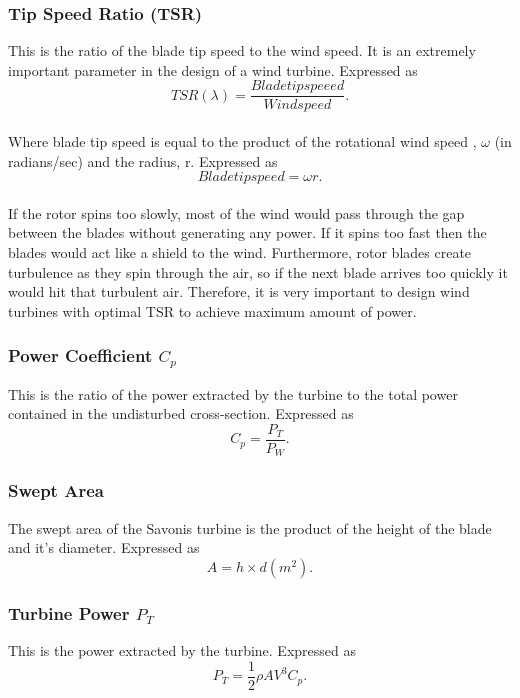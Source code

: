 \documentclass[titlepage]{article}
\begin{document}
\subsubsection{Tip Speed Ratio (TSR)} This is the ratio of the blade tip speed to the wind speed. It is an extremely important parameter in the design of a wind turbine. Expressed as 
\begin{equation}\label{}
    TSR(\lambda) = \frac{Blade tip speeed}{Wind speed}.
\end{equation}
    \paragraph{}Where blade tip speed is equal to the product of the rotational wind speed , $\omega$ (in radians/sec) and the radius, r. Expressed as 
\begin{equation}\label{}
    Bladetipspeed = \omega r.
\end{equation}
\paragraph{} If the rotor spins too slowly, most of the wind would pass through the gap between the blades without generating any power. If it spins too fast then the blades would act like a shield to the wind. Furthermore, rotor blades create turbulence as they spin through the air, so if the next blade arrives too quickly it would hit that turbulent air. Therefore, it is very important to design wind turbines with optimal TSR to achieve maximum amount of power.
\subsubsection{Power Coefficient $C_{p}$} This is the ratio of the power extracted by the turbine to the total power contained in the undisturbed cross-section. Expressed as 
\begin{equation}\label{}
 C_{p} = \frac{P_{T}}{P_{W}}.  
\end{equation}
\subsubsection{Swept Area } The swept area of the Savonis turbine is the product of the height of the blade and it's diameter. Expressed as $$A = h \times d (m^2).$$
\subsubsection{Turbine Power $P_{T}$ }  This is the power extracted by the turbine. Expressed as  
\begin{equation}\label{}
P_{T} = \frac{1}{2} \rho A V^3 C_{p}.
\end{equation}
\end{document}
